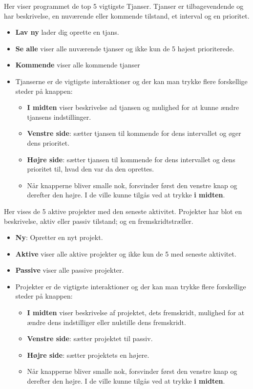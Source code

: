 \documentclass{report}
\begin{document}
Her viser programmet de top 5 vigtigste Tjanser. Tjanser er tilbagevendende og har beskrivelse, en nuværende eller kommende tilstand, et interval og en prioritet.
\begin{itemize}
\item \textbf{Lav ny} lader dig oprette en tjans.
\item \textbf{Se alle} viser alle nuværende tjanser og ikke kun de 5 højest prioriterede.
\item \textbf{Kommende} viser alle kommende tjanser
\item Tjanserne er de vigtigste interaktioner og der kan man trykke flere forskellige steder på knappen:
\begin{itemize}
\item \textbf{I midten} viser beskrivelse ad tjansen og mulighed for at kunne ændre tjansens indstillinger.
\item \textbf{Venstre side}: sætter tjansen til kommende for dens intervallet og øger dens prioritet.
\item \textbf{Højre side}: sætter tjansen til kommende for dens intervallet og dens prioritet til, hvad den var da den oprettes.
\item Når knapperne bliver smalle nok, forsvinder først den venstre knap og derefter den højre. I de ville kunne tilgås ved at trykke \textbf{i midten}.
\end{itemize}
\end{itemize}

Her vises de 5 aktive projekter med den seneste aktivitet. Projekter har blot en beskrivelse, aktiv eller passiv tilstand; og en fremskridtstræller.
\begin{itemize}
\item \textbf{Ny}: Opretter en nyt projekt.
\item \textbf{Aktive} viser alle aktive projekter og ikke kun de 5 med seneste aktivitet.
\item \textbf{Passive} viser alle passive projekter.
\item Projekter er de vigtigste interaktioner og der kan man trykke flere forskellige steder på knappen:
\begin{itemize}
\item \textbf{I midten} viser beskrivelse af projektet, dets fremskridt, mulighed for at ændre dens indstilliger eller nulstille dens fremskridt.
\item \textbf{Venstre side}: sætter projektet til passiv.
\item \textbf{Højre side}: sætter projektets en højere.
\item Når knapperne bliver smalle nok, forsvinder først den venstre knap og derefter den højre. I de ville kunne tilgås ved at trykke \textbf{i midten}.
\end{itemize}
\end{itemize}
\end{document}
